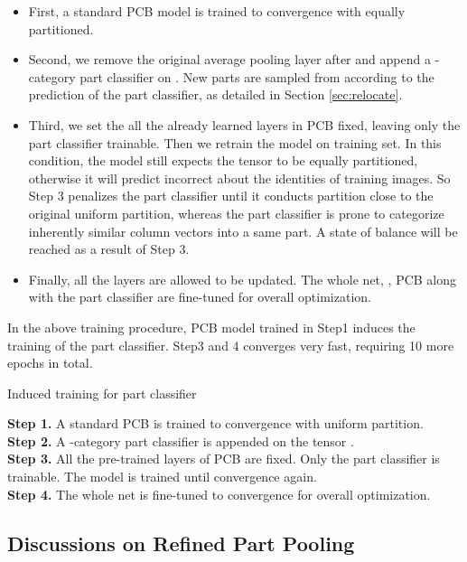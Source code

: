 \documentclass[10pt,twocolumn,letterpaper]{article}
\begin{document}
{{{\begin{itemize}
\item First, a standard PCB model is trained to convergence with  equally partitioned. 
\item Second, we remove the original average pooling layer after  and append a -category part classifier on . New parts are sampled from  according to the prediction of the part classifier, as detailed in Section \ref{sec:relocate}.
\item Third, we set the all the already learned layers in PCB fixed, leaving only the part classifier trainable. Then we retrain the model on training set. In this condition, the model still expects the tensor  to be equally partitioned, otherwise it will predict incorrect about the identities of training images. So Step 3 penalizes the part classifier until it conducts partition close to the original uniform partition, whereas the part classifier is prone to categorize inherently similar column vectors into a same part. A state of balance will be reached as a result of Step 3. 
\item Finally, all the layers are allowed to be updated. The whole net, \ie, PCB along with the part classifier are fine-tuned for overall optimization.
\end{itemize}

In the above training procedure, PCB model trained in Step1 induces the training of the part classifier. Step3 and 4 converges very fast, requiring 10 more epochs in total.

\begin{algorithm}
\caption{Induced training for part classifier}
\textbf{Step 1.} A standard PCB is trained to convergence with uniform partition.\\
\textbf{Step 2.} A -category part classifier is appended on the tensor . \\
\textbf{Step 3.} All the pre-trained layers of PCB are fixed. Only the part classifier is trainable. The model is trained until convergence again.\\
\textbf{Step 4.} The whole net is fine-tuned to convergence for overall optimization.\\
\label{alg:induction}
\end{algorithm}

\subsection{Discussions on Refined Part Pooling}

}}}
\end{document}
